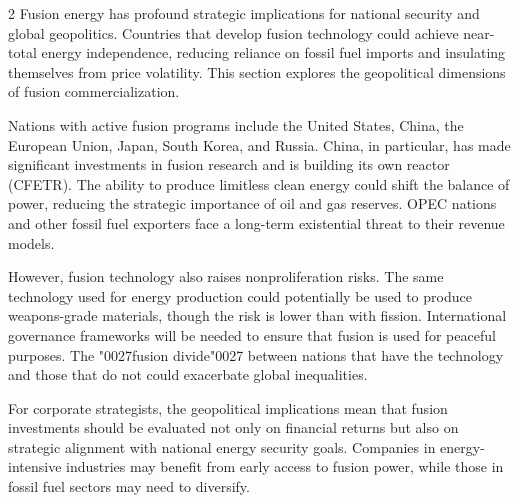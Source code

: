\documentclass[10pt,a4paper]{article}
\newcommand{\BOApos}{{\BOQuoteFont\char"0027}}
\begin{document}
\begin{multicols}{2}
{\small Fusion energy has profound strategic implications for national security and global geopolitics. Countries that develop fusion technology could achieve near-total energy independence, reducing reliance on fossil fuel imports and insulating themselves from price volatility. This section explores the geopolitical dimensions of fusion commercialization.}\par
{\small Nations with active fusion programs include the United States, China, the European Union, Japan, South Korea, and Russia. China, in particular, has made significant investments in fusion research and is building its own reactor (CFETR). The ability to produce limitless clean energy could shift the balance of power, reducing the strategic importance of oil and gas reserves. OPEC nations and other fossil fuel exporters face a long-term existential threat to their revenue models.}\par
{\small However, fusion technology also raises nonproliferation risks. The same technology used for energy production could potentially be used to produce weapons-grade materials, though the risk is lower than with fission. International governance frameworks will be needed to ensure that fusion is used for peaceful purposes. The \BOApos{}fusion divide\BOApos{} between nations that have the technology and those that do not could exacerbate global inequalities.}\par
{\small For corporate strategists, the geopolitical implications mean that fusion investments should be evaluated not only on financial returns but also on strategic alignment with national energy security goals. Companies in energy-intensive industries may benefit from early access to fusion power, while those in fossil fuel sectors may need to diversify.}\par
\end{multicols}
\label{chap:4:end}
\end{document}
